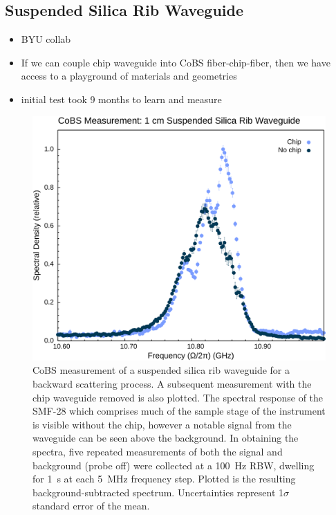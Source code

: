 \subsection{Suspended Silica Rib Waveguide}
\label{subsec:Raman:Target:Waveguide}

\begin{itemize}
  \item BYU collab
  \item If we can couple chip waveguide into CoBS fiber-chip-fiber, then we have access to a playground of materials and geometries
  \item initial test took 9 months to learn and measure
\end{itemize}

\begin{figure}[t]
  \centering
  \hspace{-2em}\includegraphics[width=.85\textwidth]{figs/4-Raman/CoBS Measurement: 1 cm Suspended Silica Rib Waveguide.png}
  \caption{\ac{CoBS} measurement of a suspended silica rib waveguide for a backward scattering process. A subsequent measurement with the chip waveguide removed is also plotted. The spectral response of the \ac{SMF-28} which comprises much of the sample stage of the instrument is visible without the chip, however a notable signal from the waveguide can be seen above the background. In obtaining the spectra, five repeated measurements of both the signal and background (probe off) were collected at a \SI{100}{\hertz} \ac{RBW}, dwelling for \SI{1}{\second} at each \SI{5}{\mega\hertz} frequency step. Plotted is the resulting background-subtracted spectrum. Uncertainties represent 1\(\sigma\) standard error of the mean.}
  \label{fig:Raman:August2024chipnochip}
\end{figure}

